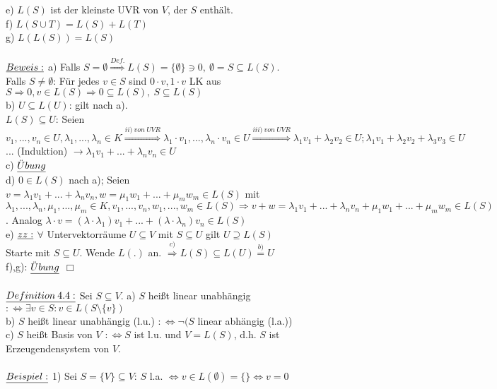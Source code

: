 \documentclass[fleqn, a4paper, 11pt]{article}
\begin{document}
e) $L(S)$ ist der kleinste UVR von $V$, der $S$ enth\"alt.\\
f) $L(S\cup T)=L(S)+L(T)$\\
g) $L(L(S))=L(S)$\\
\\
$\uline{Beweis:}$ a) Falls $S=\emptyset\stackrel{Def.}{\Rightarrow}L(S)=\{\emptyset\}\ni 0,\:\emptyset=S\subseteq L(S)$.\\
Falls $S\neq\emptyset$: F\"ur jedes $v\in S$ sind $0\cdot v,1\cdot v$ LK aus $S \Rightarrow 0,v\in L(S)\Rightarrow 0\subseteq L(S),\:S\subseteq L(S)$\\
b) $U\subseteq L(U)$: gilt nach a).\\
$L(S)\subseteq U$: Seien $v_{1},...,v_{n}\in U,\lambda_{1},...,\lambda_{n}\in K\stackrel{ii)\:von\:UVR}{\Rightarrow}\lambda_{1}\cdot v_{1},...,\lambda_{n}\cdot v_{n}\in U\stackrel{iii)\:von\:UVR}{\Rightarrow}\lambda_{1} v_{1}+\lambda_{2} v_{2}\in U; \lambda_{1} v_{1}+\lambda_{2}v_{2}+\lambda_{3}v_{3}\in U$ ... (Induktion) $\rightarrow \lambda_{1}v_{1}+...+\lambda_{n}v_{n}\in U$\\
c) $\uline{\ddot{U}bung}$\\
d) $0\in L(S)$ nach a); Seien $v=\lambda_{1}v_{1}+...+\lambda_{n}v_{n},w=\mu_{1}w_{1}+...+\mu_{m}w_{m}\in L(S)$ mit $\lambda_{1},...,\lambda_{n},\mu_{1},...,\mu_{m}\in K,v_{1},...,v_{n},w_{1},...,w_{m}\in L(S)\Rightarrow v+w=\lambda_{1}v_{1}+...+\lambda_{n}v_{n}+\mu_{1}w_{1}+...+\mu_{m}w_{m}\in L(S)$. Analog $\lambda\cdot v=(\lambda\cdot\lambda_{1})v_{1}+...+(\lambda\cdot\lambda_{n})v_{n}\in L(S)$\\
e) $\uline{zz:}$ $\forall$ Untervektorr\"aume $U\subseteq V$ mit $S\subseteq U$ gilt $U\supseteq L(S)$\\
Starte mit $S\subseteq U$. Wende $L(.)$ an. $\stackrel{c)}{\Rightarrow}L(S)\subseteq L(U)\stackrel{b)}{=}U$\\
f),g): $\uline{\ddot{U}bung}$ \hfill $\Box$\\
\\
$\uline{Definition\:4.4:}$ Sei $S\subseteq V$. a) $S$ hei\ss{}t linear unabh\"angig $:\Leftrightarrow \exists v\in S:v\in L(S\setminus\{v\})$\\
b) $S$ hei\ss{}t linear unabh\"angig (l.u.) $:\Leftrightarrow\neg(S$ linear abh\"angig (l.a.))\\
c) $S$ hei\ss{}t Basis von $V$ $:\Leftrightarrow S$ ist l.u. und $V=L(S)$, d.h. $S$ ist Erzeugendensystem von $V$.\\
\\
$\uline{Beispiel:}$ 1) Sei $S=\{V\}\subseteq V$: $S$ l.a. $\Leftrightarrow v\in L(\emptyset)=\{\}\Leftrightarrow v=0$\\
\end{document}
